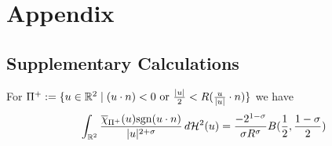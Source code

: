 \documentclass{article}
\newcommand{\haus}[2]{\mathcal{H}^{#1}\parens{#2}}
\newcommand{\R}[1]{\mathbb{R}^{#1}}
\newcommand{\optparens}[1]{\ifthenelse{\equal{#1}{}}{}{\parens{#1}}}
\newcommand{\chit}[2]{\overline{\chi}_{#1}\optparens{#2}}
\newcommand{\B}[1]{B\parens{#1}}
\newcommand{\sgn}[1]{\mathrm{sgn}\parens{#1}}
\newcommand{\Pu}{\Pi^+}
\renewcommand{\dot}[2]{{#1}\cdot{#2}}
\newcommand{\pdot}[2]{\parens{\dot{#1}{#2}}}
\begin{document}
\section{Appendix}%

\subsection{Supplementary Calculations}

\begin{lemma} \label{lem:pu}%
  For $\Pu := \braces{u \in \R{2} \mid \pdot{u}{n} < 0 \textup{ or } \frac{\abs{u}}{2} < R\pdot{\frac{u}{\abs{u}}}{n}}$ we have
  $$
  \int_{\R{2}} \frac{\chit{\Pu}{u}\sgn{\dot{u}{n}}}{\abs{u}^{2+\sigma}} \, d\haus{2}{u} = \frac{-2^{1-\sigma}}{\sigma R^{\sigma}} \B{\frac{1}{2}, \frac{1-\sigma}{2}}
  $$
\end{lemma}
\end{document}
